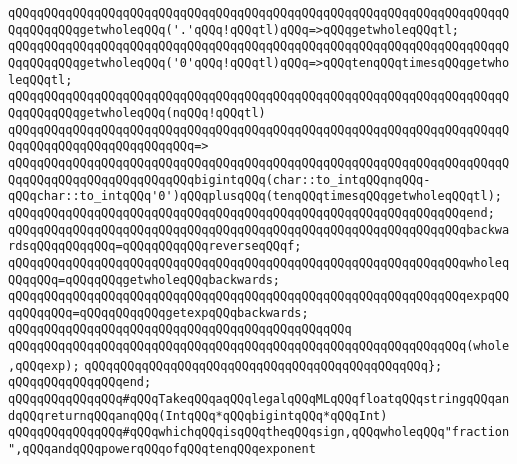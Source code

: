 \verb|qQQqqQQqqQQqqQQqqQQqqQQqqQQqqQQqqQQqqQQqqQQqqQQqqQQqqQQqqQQqqQQqqQQqqQQqqQQqqQQqgetwholeqQQq('.'qQQq!qQQqtl)qQQq=>qQQqgetwholeqQQqtl;|\newline
\verb|qQQqqQQqqQQqqQQqqQQqqQQqqQQqqQQqqQQqqQQqqQQqqQQqqQQqqQQqqQQqqQQqqQQqqQQqqQQqqQQqgetwholeqQQq('0'qQQq!qQQqtl)qQQq=>qQQqtenqQQqtimesqQQqgetwholeqQQqtl;|\newline
\newline
\verb|qQQqqQQqqQQqqQQqqQQqqQQqqQQqqQQqqQQqqQQqqQQqqQQqqQQqqQQqqQQqqQQqqQQqqQQqqQQqqQQqgetwholeqQQq(nqQQq!qQQqtl)|\newline
\verb|qQQqqQQqqQQqqQQqqQQqqQQqqQQqqQQqqQQqqQQqqQQqqQQqqQQqqQQqqQQqqQQqqQQqqQQqqQQqqQQqqQQqqQQqqQQqqQQq=>|\newline
\verb|qQQqqQQqqQQqqQQqqQQqqQQqqQQqqQQqqQQqqQQqqQQqqQQqqQQqqQQqqQQqqQQqqQQqqQQqqQQqqQQqqQQqqQQqqQQqqQQqbigintqQQq(char::to_intqQQqnqQQq-qQQqchar::to_intqQQq'0')qQQqplusqQQq(tenqQQqtimesqQQqgetwholeqQQqtl);|\newline
\verb|qQQqqQQqqQQqqQQqqQQqqQQqqQQqqQQqqQQqqQQqqQQqqQQqqQQqqQQqqQQqqQQqend;|\newline
\newline
\verb|qQQqqQQqqQQqqQQqqQQqqQQqqQQqqQQqqQQqqQQqqQQqqQQqqQQqqQQqqQQqqQQqbackwardsqQQqqQQqqQQq=qQQqqQQqqQQqreverseqQQqf;|\newline
\newline
\verb|qQQqqQQqqQQqqQQqqQQqqQQqqQQqqQQqqQQqqQQqqQQqqQQqqQQqqQQqqQQqqQQqwholeqQQqqQQq=qQQqqQQqgetwholeqQQqbackwards;|\newline
\newline
\verb|qQQqqQQqqQQqqQQqqQQqqQQqqQQqqQQqqQQqqQQqqQQqqQQqqQQqqQQqqQQqqQQqexpqQQqqQQqqQQq=qQQqqQQqqQQqgetexpqQQqbackwards;|\newline
\verb|qQQqqQQqqQQqqQQqqQQqqQQqqQQqqQQqqQQqqQQqqQQqqQQq|\newline
\verb|qQQqqQQqqQQqqQQqqQQqqQQqqQQqqQQqqQQqqQQqqQQqqQQqqQQqqQQqqQQqqQQq(whole,qQQqexp);|\newline
\verb|qQQqqQQqqQQqqQQqqQQqqQQqqQQqqQQqqQQqqQQqqQQqqQQq};|\newline
\verb|qQQqqQQqqQQqqQQqend;|\newline
\newline
\verb|qQQqqQQqqQQqqQQq#qQQqTakeqQQqaqQQqlegalqQQqMLqQQqfloatqQQqstringqQQqandqQQqreturnqQQqanqQQq(IntqQQq*qQQqbigintqQQq*qQQqInt)|\newline
\verb|qQQqqQQqqQQqqQQq#qQQqwhichqQQqisqQQqtheqQQqsign,qQQqwholeqQQq"fraction",qQQqandqQQqpowerqQQqofqQQqtenqQQqexponent|\newline
